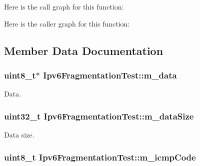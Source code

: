 Here is the call graph for this function\+:




Here is the caller graph for this function\+:




\subsection{Member Data Documentation}
\subsubsection[{\texorpdfstring{m\+\_\+data}{m_data}}]{\setlength{\rightskip}{0pt plus 5cm}uint8\+\_\+t$\ast$ Ipv6\+Fragmentation\+Test\+::m\+\_\+data\hspace{0.3cm}{\ttfamily [private]}}\hypertarget{classIpv6FragmentationTest_af7b77e77aad9b5667512c25a3f7eef83}{}\label{classIpv6FragmentationTest_af7b77e77aad9b5667512c25a3f7eef83}


Data. 

\subsubsection[{\texorpdfstring{m\+\_\+data\+Size}{m_dataSize}}]{\setlength{\rightskip}{0pt plus 5cm}uint32\+\_\+t Ipv6\+Fragmentation\+Test\+::m\+\_\+data\+Size\hspace{0.3cm}{\ttfamily [private]}}\hypertarget{classIpv6FragmentationTest_a5fa7017430c2a39ffb33c5bdaaed7402}{}\label{classIpv6FragmentationTest_a5fa7017430c2a39ffb33c5bdaaed7402}


Data size. 

\subsubsection[{\texorpdfstring{m\+\_\+icmp\+Code}{m_icmpCode}}]{\setlength{\rightskip}{0pt plus 5cm}uint8\+\_\+t Ipv6\+Fragmentation\+Test\+::m\+\_\+icmp\+Code\hspace{0.3cm}{\ttfamily [private]}}\hypertarget{classIpv6FragmentationTest_a6d12c2608f87aa36c54cd9d7bdf3e558}{}\label{classIpv6FragmentationTest_a6d12c2608f87aa36c54cd9d7bdf3e558}


